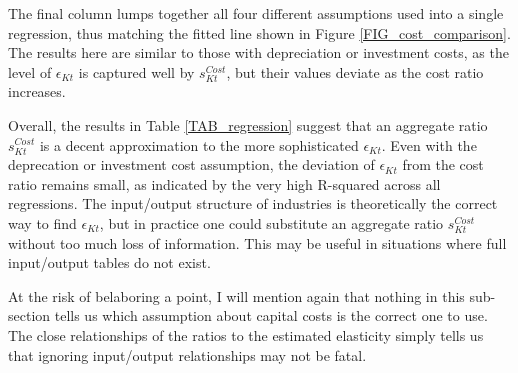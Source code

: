 The final column lumps together all four different assumptions used into a single regression, thus matching the fitted line shown in Figure \ref{FIG_cost_comparison}. The results here are similar to those with depreciation or investment costs, as the level of $\epsilon_{Kt}$ is captured well by $s^{Cost}_{Kt}$, but their values deviate as the cost ratio increases.

Overall, the results in Table \ref{TAB_regression} suggest that an aggregate ratio $s^{Cost}_{Kt}$ is a decent approximation to the more sophisticated $\epsilon_{Kt}$. Even with the deprecation or investment cost assumption, the deviation of $\epsilon_{Kt}$ from the cost ratio remains small, as indicated by the very high R-squared across all regressions. The input/output structure of industries is theoretically the correct way to find $\epsilon_{Kt}$, but in practice one could substitute an aggregate ratio $s^{Cost}_{Kt}$ without too much loss of information. This may be useful in situations where full input/output tables do not exist. 

At the risk of belaboring a point, I will mention again that nothing in this sub-section tells us which assumption about capital costs is the correct one to use. The close relationships of the ratios to the estimated elasticity simply tells us that ignoring input/output relationships may not be fatal.